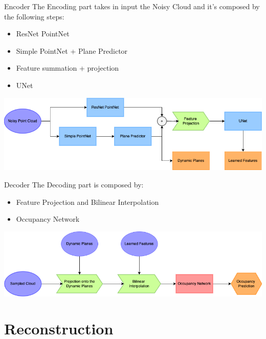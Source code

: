 \documentclass{beamer}
\begin{document}
\begin{frame}{Encoder}
The Encoding part takes in input the Noisy Cloud and it's composed by the following steps:
\begin{itemize}
\item ResNet PointNet
\item Simple PointNet + Plane Predictor 
\item Feature summation + projection 
\item UNet
\end{itemize}
\includegraphics[width=\textwidth]{../media/encoder_pipeline.png}
\end{frame}

\begin{frame}{Decoder}
The Decoding part is composed by:
\begin{itemize}
\item Feature Projection and Bilinear Interpolation
\item Occupancy Network
\end{itemize}
\includegraphics[width=\textwidth]{../media/decoder_pipeline.png}
\end{frame}

\section{Reconstruction}
\end{document}
